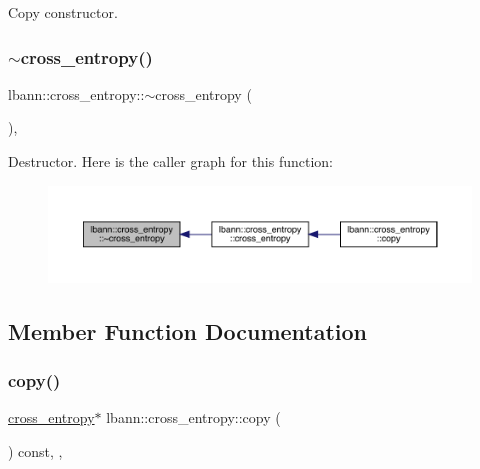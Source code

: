Copy constructor. \mbox{\label{classlbann_1_1cross__entropy_a9876fd9cc40a76acb219a875f66dfdb7}} 
\subsubsection{\texorpdfstring{$\sim$cross\+\_\+entropy()}{~cross\_entropy()}}
{\footnotesize\ttfamily lbann\+::cross\+\_\+entropy\+::$\sim$cross\+\_\+entropy (\begin{DoxyParamCaption}{ }\end{DoxyParamCaption})\hspace{0.3cm}{\ttfamily [override]}, {\ttfamily [default]}}

Destructor. Here is the caller graph for this function\+:\nopagebreak
\begin{figure}[H]
\begin{center}
\leavevmode
\includegraphics[width=350pt]{classlbann_1_1cross__entropy_a9876fd9cc40a76acb219a875f66dfdb7_icgraph}
\end{center}
\end{figure}


\subsection{Member Function Documentation}
\mbox{\label{classlbann_1_1cross__entropy_a5d709e7cf0a3a260ba8d5c558aebda88}} 
\subsubsection{\texorpdfstring{copy()}{copy()}}
{\footnotesize\ttfamily \hyperlink{classlbann_1_1cross__entropy}{cross\+\_\+entropy}$\ast$ lbann\+::cross\+\_\+entropy\+::copy (\begin{DoxyParamCaption}{ }\end{DoxyParamCaption}) const\hspace{0.3cm}{\ttfamily [inline]}, {\ttfamily [override]}, {\ttfamily [virtual]}}

